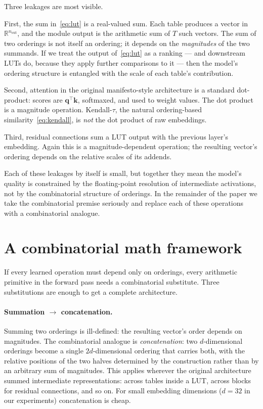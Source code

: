 \documentclass[11pt]{article}
\begin{document}
Three leakages are most visible.

First, the sum in~\eqref{eq:lut} is a real-valued sum.
Each table produces a vector in $\mathbb{R}^{n_\mathrm{out}}$, and the module output is the arithmetic sum of $T$ such vectors.
The sum of two orderings is not itself an ordering; it depends on the \emph{magnitudes} of the two summands.
If we treat the output of~\eqref{eq:lut} as a ranking --- and downstream LUTs do, because they apply further comparisons to it --- then the model's ordering structure is entangled with the scale of each table's contribution.

Second, attention in the original manifesto-style architecture is a standard dot-product: scores are $\mathbf{q}^\top \mathbf{k}$, softmaxed, and used to weight values.
The dot product is a magnitude operation.
Kendall-$\tau$, the natural ordering-based similarity~\eqref{eq:kendall}, is \emph{not} the dot product of raw embeddings.

Third, residual connections sum a LUT output with the previous layer's embedding.
Again this is a magnitude-dependent operation; the resulting vector's ordering depends on the relative scales of its addends.

Each of these leakages by itself is small, but together they mean the model's quality is constrained by the floating-point resolution of intermediate activations, not by the combinatorial structure of orderings.
In the remainder of the paper we take the combinatorial premise seriously and replace each of these operations with a combinatorial analogue.


\section{A combinatorial math framework}
\label{sec:framework}

If every learned operation must depend only on orderings, every arithmetic primitive in the forward pass needs a combinatorial substitute.
Three substitutions are enough to get a complete architecture.

\paragraph{Summation $\to$ concatenation.}
Summing two orderings is ill-defined: the resulting vector's order depends on magnitudes.
The combinatorial analogue is \emph{concatenation}: two $d$-dimensional orderings become a single $2d$-dimensional ordering that carries both, with the relative positions of the two halves determined by the construction rather than by an arbitrary sum of magnitudes.
This applies wherever the original architecture summed intermediate representations: across tables inside a LUT, across blocks for residual connections, and so on.
For small embedding dimensions ($d = 32$ in our experiments) concatenation is cheap.
\end{document}
